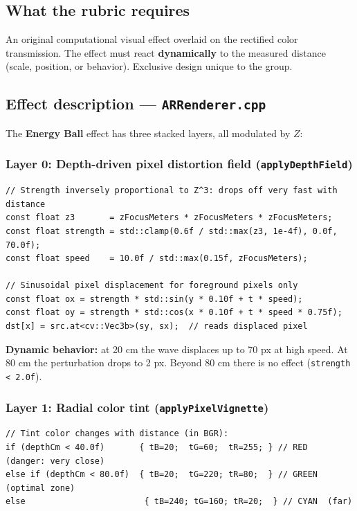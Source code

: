 \documentclass[11pt,a4paper]{article}
\begin{document}
\subsection*{What the rubric requires}
An original computational visual effect overlaid on the rectified color transmission.
The effect must react \textbf{dynamically} to the measured distance (scale, position,
or behavior). Exclusive design unique to the group.

\subsection*{Effect description --- \texttt{ARRenderer.cpp}}

The \textbf{Energy Ball} effect has three stacked layers, all modulated by $Z$:

\subsubsection*{Layer 0: Depth-driven pixel distortion field (\texttt{applyDepthField})}

\begin{lstlisting}[caption={Depth-reactive wave distortion}]
// Strength inversely proportional to Z^3: drops off very fast with distance
const float z3       = zFocusMeters * zFocusMeters * zFocusMeters;
const float strength = std::clamp(0.6f / std::max(z3, 1e-4f), 0.0f, 70.0f);
const float speed    = 10.0f / std::max(0.15f, zFocusMeters);

// Sinusoidal pixel displacement for foreground pixels only
const float ox = strength * std::sin(y * 0.10f + t * speed);
const float oy = strength * std::cos(x * 0.10f + t * speed * 0.75f);
dst[x] = src.at<cv::Vec3b>(sy, sx);  // reads displaced pixel
\end{lstlisting}

\noindent\textbf{Dynamic behavior:} at 20 cm the wave displaces up to 70 px at high speed.
At 80 cm the perturbation drops to 2 px. Beyond 80 cm there is no effect (\texttt{strength < 2.0f}).

\subsubsection*{Layer 1: Radial color tint (\texttt{applyPixelVignette})}

\begin{lstlisting}[caption={Tint color reactive to distance}]
// Tint color changes with distance (in BGR):
if (depthCm < 40.0f)       { tB=20;  tG=60;  tR=255; } // RED  (danger: very close)
else if (depthCm < 80.0f)  { tB=20;  tG=220; tR=80;  } // GREEN (optimal zone)
else                        { tB=240; tG=160; tR=20;  } // CYAN  (far)
\end{lstlisting}
\end{document}
